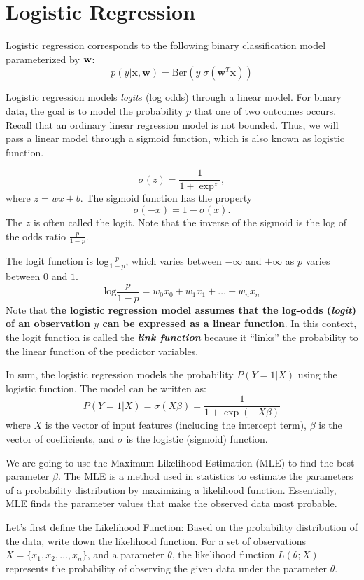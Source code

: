 \section{Logistic Regression}
\label{sec:logistic_regression}

Logistic regression corresponds to the following binary classification model parameterized by ${\mathbf{w}}$:
$$p(y|\mathbf{x},\mathbf{w})=\textrm{Ber}(y|\sigma(\mathbf{w}^T\mathbf{x}))$$

Logistic regression models \textit{logit}s (log odds) through a linear model. For binary data, the goal is to model the probability $p$ that one of two outcomes occurs. Recall that an ordinary linear regression model is not bounded. Thus, we will pass a linear model through a sigmoid function, which is also known as logistic function. 

$$\sigma(z) = \frac{1}{1+\exp^{z}},$$
where $z=wx+b.$
The sigmoid function has the property
$$\sigma(-x) = 1-\sigma(x).$$
The $z$ is often called the logit. Note that the inverse of the sigmoid is the log of the odds ratio $\frac{p}{1-p}.$

The logit function is $\textrm{log}\frac{p}{1-p}$, which varies between $-\infty$ and $+\infty$ as $p$ varies between $0$ and $1$.
$$\textrm{log}\frac{p}{1-p} = w_0x_0 +  w_1x_1 + \dots + w_nx_n$$
Note that \textbf{the logistic regression model assumes that the log-odds (\textit{logit}) of an observation $y$ can be expressed as a linear function}. In this context, the logit function is called the \textbf{\textit{link function}} because it ``links'' the probability to the linear function of the predictor variables.

In sum, the logistic regression models the probability \( P(Y = 1 | X) \) using the logistic function. The model can be written as:
\[
P(Y = 1 | X) = \sigma(X \beta) = \frac{1}{1 + \exp(-X \beta)}
\]
where \( X \) is the vector of input features (including the intercept term), \( \beta \) is the vector of coefficients, and \( \sigma \) is the logistic (sigmoid) function.

We are going to use the Maximum Likelihood Estimation (MLE) to find the best parameter $\beta$. The MLE is a method used in statistics to estimate the parameters of a probability distribution by maximizing a likelihood function. Essentially, MLE finds the parameter values that make the observed data most probable.

Let's first define the Likelihood Function: Based on the probability distribution of the data, write down the likelihood function. For a set of observations \(X = \{x_1, x_2, \ldots, x_n\}\), and a parameter \(\theta\), the likelihood function \(L(\theta; X)\) represents the probability of observing the given data under the parameter \(\theta\).

